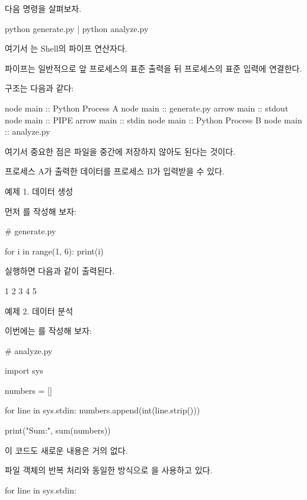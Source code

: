 다음 명령을 살펴보자.

\begin{dhkzsh}
python generate.py | python analyze.py
\end{dhkzsh}

여기서 \zsh{|}는 Shell의 파이프 연산자다.

파이프는 일반적으로 앞 프로세스의 표준 출력을 뒤 프로세스의 표준 입력에 연결한다.

구조는 다음과 같다:

\begin{dhkbranch}
node main :: Python Process A
node main :: generate.py
arrow main :: stdout
node main :: PIPE
arrow main :: stdin
node main :: Python Process B
node main :: analyze.py
\end{dhkbranch}

여기서 중요한 점은 파일을 중간에 저장하지 않아도 된다는 것이다.

프로세스 A가 출력한 데이터를 프로세스 B가 입력받을 수 있다.

예제 1. 데이터 생성

먼저 를 작성해 보자:

\begin{dhkcode}
# generate.py

for i in range(1, 6):
    print(i)
\end{dhkcode}

실행하면 다음과 같이 출력된다.

\begin{dhkzsh}
1
2
3
4
5
\end{dhkzsh}

예제 2. 데이터 분석

이번에는 를 작성해 보자:

\begin{dhkcode}
# analyze.py

import sys

numbers = []

for line in sys.stdin:
    numbers.append(int(line.strip()))

print("Sum:", sum(numbers))
\end{dhkcode}

이 코드도 새로운 내용은 거의 없다.

파일 객체의 반복 처리와 동일한 방식으로 을 사용하고 있다.

\begin{dhkcode}
for line in sys.stdin:
\end{dhkcode}

